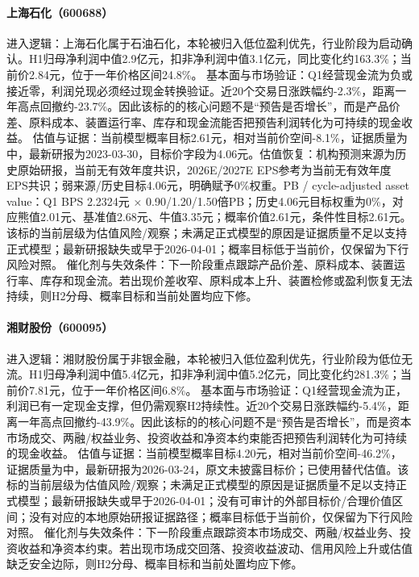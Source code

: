 \paragraph{上海石化（600688）}
进入逻辑：上海石化属于石油石化，本轮被归入低位盈利优先，行业阶段为启动确认。H1归母净利润中值2.9亿元，扣非净利润中值3.1亿元，同比变化约163.3\%；当前价2.84元，位于一年价格区间24.8\%。
基本面与市场验证：Q1经营现金流为负或接近零，利润兑现必须经过现金转换验证。近20个交易日涨跌幅约-2.3\%，距离一年高点回撤约-23.7\%。因此该标的的核心问题不是“预告是否增长”，而是产品价差、原料成本、装置运行率、库存和现金流能否把预告利润转化为可持续的现金收益。
估值与证据：当前模型概率目标2.61元，相对当前价空间-8.1\%，证据质量为中，最新研报为2023-03-30，目标价字段为4.06元。估值恢复：机构预测来源为历史原始研报，当前无有效年度共识，2026E/2027E EPS参考为当前无有效年度EPS共识；弱来源/历史目标4.06元，明确赋予0\%权重。PB / cycle-adjusted asset value：Q1 BPS 2.2324元 × 0.90/1.20/1.50倍PB；历史4.06元目标权重为0\%，对应熊值2.01元、基准值2.68元、牛值3.35元；概率价值2.61元，条件性目标2.61元。该标的当前层级为估值风险/观察；未满足正式模型的原因是证据质量不足以支持正式模型；最新研报缺失或早于2026-04-01；概率目标低于当前价，仅保留为下行风险对照。
催化剂与失效条件：下一阶段重点跟踪产品价差、原料成本、装置运行率、库存和现金流。若出现价差收窄、原料成本上升、装置检修或盈利恢复无法持续，则H2分母、概率目标和当前处置均应下修。

\paragraph{湘财股份（600095）}
进入逻辑：湘财股份属于非银金融，本轮被归入低位盈利优先，行业阶段为低位无流。H1归母净利润中值5.4亿元，扣非净利润中值5.2亿元，同比变化约281.3\%；当前价7.81元，位于一年价格区间6.8\%。
基本面与市场验证：Q1经营现金流为正，利润已有一定现金支撑，但仍需观察H2持续性。近20个交易日涨跌幅约-5.4\%，距离一年高点回撤约-43.9\%。因此该标的的核心问题不是“预告是否增长”，而是资本市场成交、两融/权益业务、投资收益和净资本约束能否把预告利润转化为可持续的现金收益。
估值与证据：当前模型概率目标4.20元，相对当前价空间-46.2\%，证据质量为中，最新研报为2026-03-24，原文未披露目标价；已使用替代估值。该标的当前层级为估值风险/观察；未满足正式模型的原因是证据质量不足以支持正式模型；最新研报缺失或早于2026-04-01；没有可审计的外部目标价/合理价值区间；没有对应的本地原始研报证据路径；概率目标低于当前价，仅保留为下行风险对照。
催化剂与失效条件：下一阶段重点跟踪资本市场成交、两融/权益业务、投资收益和净资本约束。若出现市场成交回落、投资收益波动、信用风险上升或估值缺乏安全边际，则H2分母、概率目标和当前处置均应下修。

